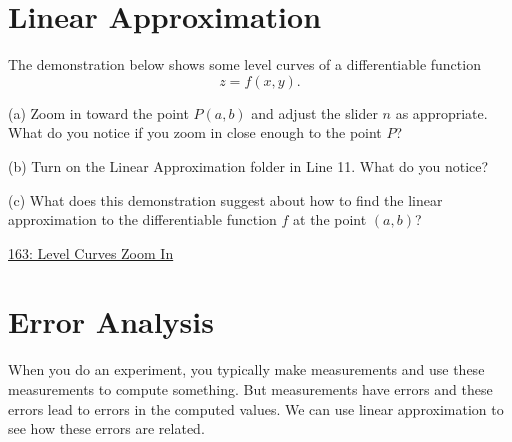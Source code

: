 \documentclass{ximera}
\begin{document}
\section{Linear Approximation}
\begin{exploration}  \label{Ecgnbhyrt}
The demonstration below shows some level curves of a differentiable function
\[
   z = f(x,y) .
\]

(a) Zoom in toward the point $P(a,b)$ and adjust the slider $n$ as appropriate. What do you notice if you zoom in close enough to the point $P$?

(b) Turn on the Linear Approximation folder in Line 11. What do you notice?

(c) What does this demonstration suggest about how to find the linear approximation to the differentiable function $f$ at the point $(a,b)$?


 
\begin{onlineOnly}
    \begin{center}
\end{center}
\end{onlineOnly}


\href{https://www.desmos.com/calculator/8hphbdetoj}{163: Level Curves Zoom In}

\end{exploration}


\section{Error Analysis}
When you do an experiment, you typically make measurements and use these measurements to compute something. But measurements have errors and these errors lead to errors in the computed values. We can use linear approximation to see how these errors are related.
\end{document}
